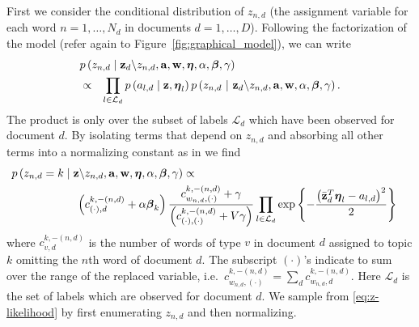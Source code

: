 First we consider the conditional distribution of $z_{n,d}$ (the assignment variable
for each word $n=1,\ldots,N_{d}$ in documents $d=1,\ldots,D$). 
Following the factorization of the model (refer again to Figure~\ref{fig:graphical_model}), we can write
\begin{eqnarray*}
\lefteqn{p\left(z_{n,d}\mid\mathbf{z}_d\backslash z_{n,d},\mathbf{a},\mathbf{w},\mathbf{\boldsymbol\eta},\alpha,\boldsymbol\beta,\gamma\right)}\\
&\propto&\prod_{l\in\mathcal{L}_{d}}p\left(a_{l,d}\mid\mathbf{z},\boldsymbol\eta_{l}\right)p\left(z_{n,d}\ |\ \mathbf{z}_d\backslash z_{n,d},\mathbf{a},\mathbf{w},\alpha,\boldsymbol\beta,\gamma\right).\end{eqnarray*}
 The product is only over the subset of labels $\mathcal{L}_{d}$
which have been observed for document $d$. By isolating terms that
depend on $z_{n,d}$ and absorbing all other terms into a normalizing
constant as in \cite{Griffiths04} we find 
\begin{eqnarray}
\lefteqn{p\left(z_{n,d}=k\mid\mathbf{z}\backslash z_{n,d},\mathbf{a},\mathbf{w},\mathbf{\boldsymbol\eta},\alpha,\boldsymbol\beta,\gamma\right)\propto} \label{eq:z-likelihood} \\
 & \hspace{2cm}\left(c_{\left(\cdot\right),d}^{k,-\left(n,d\right)}+\alpha\boldsymbol\beta_{k}\right)\frac{c_{w_{n,d},\left(\cdot\right)}^{k,-\left(n,d\right)}+\gamma}{\left(c_{\left(\cdot\right),\left(\cdot\right)}^{k,-\left(n,d\right)}+V\gamma\right)}\prod_{l\in\mathcal{L}_{d}}\exp\left\{ -\frac{\left(\bar{\mathbf{z}}_{d}^{T}\boldsymbol\eta_{l}-a_{l,d}\right)^{2}}{2}\right\}\nonumber\end{eqnarray}
 where $c_{v,d}^{k,-\left(n,d\right)}$ is the number
of words of type $v$ in document $d$ assigned to topic $k$ omitting
the $n$th word of document $d$. The subscript $(\cdot)$'s
indicate to sum over the range of the replaced variable, i.e.~$ {c_{w_{n,d},\left(\cdot\right)}^{k,-\left(n,d\right)}} = \sum_d {c_{w_{n,d},d}^{k,-\left(n,d\right)}}$.  Here $\mathcal{L}_{d}$ is the set of labels which are observed for document $d$.  We sample from \eqref{eq:z-likelihood}  by first enumerating $z_{n,d}$ and then normalizing.
%

